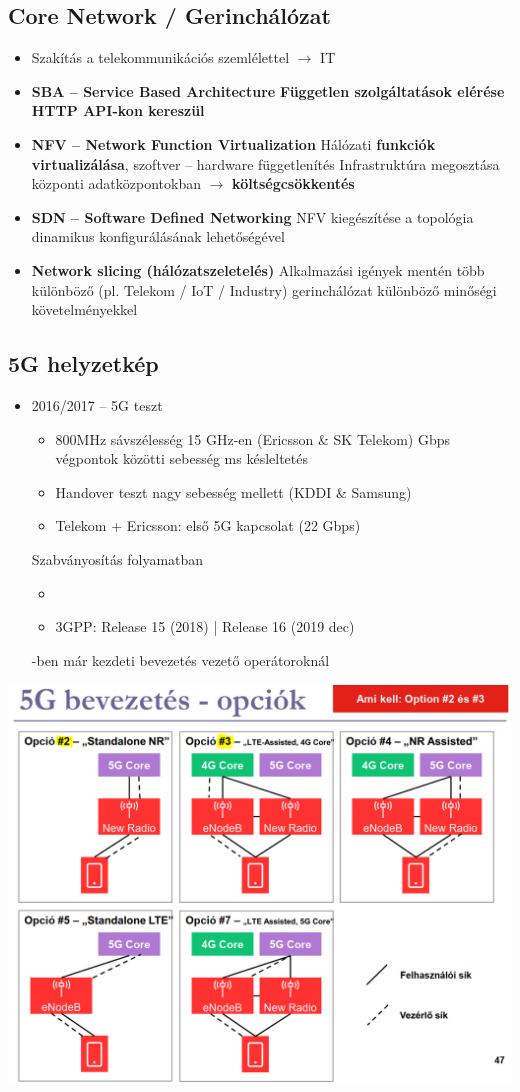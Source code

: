 \documentclass[10pt,a4paper]{article}
\begin{document}
\subsection{Core Network / Gerinchálózat}
	\begin{itemize}
		\item Szakítás a telekommunikációs szemlélettel $\rightarrow$ IT
		\item\textbf{ SBA – Service Based Architecture}
			\subitem \textbf{Független szolgáltatások elérése HTTP API-kon kereszül}
		\item \textbf{NFV – Network Function Virtualization}
			\subitem Hálózati \textbf{funkciók virtualizálása}, szoftver – hardware függetlenítés
			\subitem Infrastruktúra megosztása központi adatközpontokban $\rightarrow$ \textbf{költségcsökkentés}
		\item \textbf{SDN – Software Defined Networking}
			\subitem NFV kiegészítése a topológia dinamikus konfigurálásának lehetőségével
		\item \textbf{Network slicing (hálózatszeletelés)}
			\subitem Alkalmazási igények mentén több különböző (pl. Telekom / IoT / Industry)
		gerinchálózat különböző minőségi követelményekkel
	\end{itemize}
\subsection{5G helyzetkép}
	\begin{itemize}
		\item 2016/2017 – 5G teszt
		\begin{itemize}
			\item 800MHz sávszélesség 15 GHz-en (Ericsson \& SK Telekom)
		 Gbps végpontok közötti sebesség
		 ms késleltetés
		\item Handover teszt nagy sebesség mellett (KDDI \& Samsung)
		\item Telekom + Ericsson: első 5G kapcsolat (22 Gbps)
		\end{itemize}
		\subitem Szabványosítás folyamatban
		\begin{itemize}
			\item \item 3GPP: Release 15 (2018) | Release 16 (2019 dec)
		\end{itemize}
		-ben már kezdeti bevezetés vezető operátoroknál
	\end{itemize}
\begin{center}
	\includegraphics[width=0.6\linewidth]{src/5gopciok}
\end{center}
\end{document}
